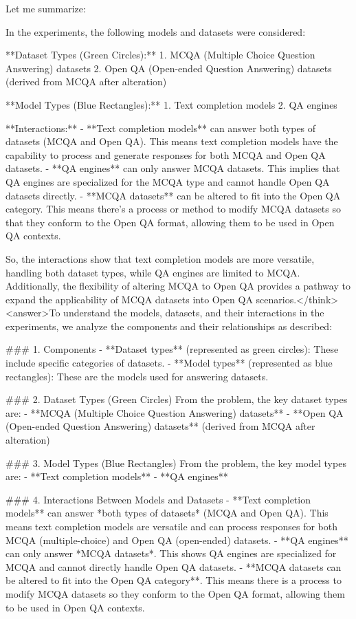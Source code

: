Let me summarize:

In the experiments, the following models and datasets were considered:

**Dataset Types (Green Circles):**
1. MCQA (Multiple Choice Question Answering) datasets
2. Open QA (Open-ended Question Answering) datasets (derived from MCQA after alteration)

**Model Types (Blue Rectangles):**
1. Text completion models
2. QA engines

**Interactions:**
- **Text completion models** can answer both types of datasets (MCQA and Open QA). This means text completion models have the capability to process and generate responses for both MCQA and Open QA datasets.
- **QA engines** can only answer MCQA datasets. This implies that QA engines are specialized for the MCQA type and cannot handle Open QA datasets directly.
- **MCQA datasets** can be altered to fit into the Open QA category. This means there's a process or method to modify MCQA datasets so that they conform to the Open QA format, allowing them to be used in Open QA contexts.

So, the interactions show that text completion models are more versatile, handling both dataset types, while QA engines are limited to MCQA. Additionally, the flexibility of altering MCQA to Open QA provides a pathway to expand the applicability of MCQA datasets into Open QA scenarios.</think><answer>To understand the models, datasets, and their interactions in the experiments, we analyze the components and their relationships as described:  


### 1. Components  
- **Dataset types** (represented as green circles): These include specific categories of datasets.  
- **Model types** (represented as blue rectangles): These are the models used for answering datasets.    


### 2. Dataset Types (Green Circles)  
From the problem, the key dataset types are:  
- **MCQA (Multiple Choice Question Answering) datasets**  
- **Open QA (Open-ended Question Answering) datasets** (derived from MCQA after alteration)    


### 3. Model Types (Blue Rectangles)  
From the problem, the key model types are:  
- **Text completion models**  
- **QA engines**    


### 4. Interactions Between Models and Datasets  
- **Text completion models** can answer *both types of datasets* (MCQA and Open QA). This means text completion models are versatile and can process responses for both MCQA (multiple-choice) and Open QA (open-ended) datasets.  
- **QA engines** can only answer *MCQA datasets*. This shows QA engines are specialized for MCQA and cannot directly handle Open QA datasets.  
- **MCQA datasets can be altered to fit into the Open QA category**. This means there is a process to modify MCQA datasets so they conform to the Open QA format, allowing them to be used in Open QA contexts.    


